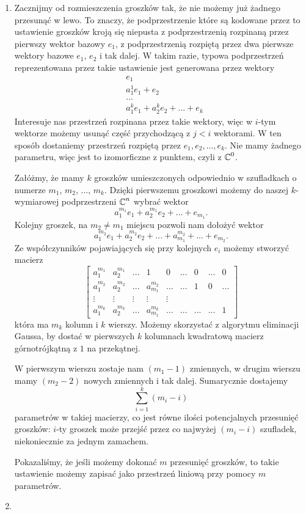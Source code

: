 \begin{enumerate}[label=\textbf{(\alph*)}]
  \item Zacznijmy od rozmieszczenia groszków tak, że nie możemy już żadnego przesunąć w lewo. To znaczy, że podprzestrzenie które są kodowane przez to ustawienie groszków kroją się niepusta z podprzestrzenią rozpinaną przez pierwszy wektor bazowy $e_1$, z podprzestrzenią rozpiętą przez dwa pierwsze wektory bazowe $e_1$, $e_2$ i tak dalej. W takim razie, typowa podprzestrzeń reprezentowana przez takie ustawienie jest generowana przez wektory
    \begin{align*}
      &e_1\\ 
      &a_1^1e_1+e_2\\ 
      &...\\ 
      &a_1^ke_1+a_2^ke_2+...+e_k
    \end{align*}
    Interesuje nas przestrzeń rozpinana przez takie wektory, więc w $i$-tym wektorze możemy usunąć część przychodzącą z $j<i$ wektorami. W ten sposób dostaniemy przestrzeń rozpiętą przez $e_1, e_2, ...,e_k$. Nie mamy żadnego parametru, więc jest to izomorficzne z punktem, czyli z $\operatorname{\mathbb{C}}^0$.

    Załóżmy, że mamy $k$ groszków umieszczonych odpowiednio w szufladkach o numerze $m_1$, $m_2$, ..., $m_k$. Dzięki pierwszemu groszkowi możemy do naszej $k$-wymiarowej podprzestrzeni $\operatorname{\mathbb{C}}^n$ wybrać wektor
    $$a_1^{m_1}e_1+a_2^{m_1}e_2+...+e_{m_1}.$$
    Kolejny groszek, na $m_2\neq m_1$ miejscu pozwoli nam dołożyć wektor
    $$a_1^{m_2}e_1+a_2^{m_2}e_2+...+a_{m_1}^{m_2}+...+e_{m_2}.$$
    Ze współczynników pojawiających się przy kolejnych $e_i$ możemy stworzyć macierz
    $$
    \begin{bmatrix}
      a_1^{m_1} & a_2^{m_1} & ... & 1 & 0 & ... & 0 & ... & 0\\ 
      a_1^{m_2} & a_2^{m_2} & ... & a_{m_1}^{m_2} & ... & ... & 1 & 0 & ...\\ 
      \vdots & \vdots & \vdots & \vdots & \vdots\\ 
      a_1^{m_k} & a_2^{m_k} & ... & a_{m_1}^{m_k} & ... & ... & ... & ... & 1 
    \end{bmatrix}
    $$
    która ma $m_k$ kolumn i $k$ wierszy. Możemy skorzystać z algorytmu eliminacji Gaussa, by dostać w pierwszych $k$ kolumnach kwadratową macierz górnotrójkątną z $1$ na przekątnej. 

    W pierwszym wierszu zostaje nam $(m_1-1)$ zmiennych, w drugim wierszu mamy $(m_2-2)$ nowych zmiennych i tak dalej. Sumarycznie dostajemy
    $$\sum_{i=1}^k(m_i-i)$$
    parametrów w takiej macierzy, co jest równe ilości potencjalnych przesunięć groszków: $i$-ty groszek może przejść przez co najwyżej $(m_i-i)$ szufladek, niekoniecznie za jednym zamachem.

    Pokazaliśmy, że jeśli możemy dokonać $m$ przesunięć groszków, to takie ustawienie możemy zapisać jako przestrzeń liniową przy pomocy $m$ parametrów.

  \item 
\end{enumerate}
